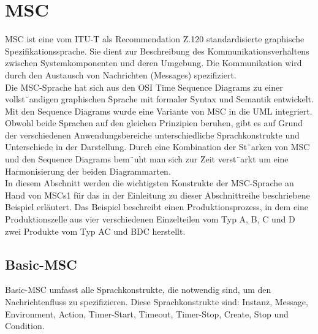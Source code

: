 
\section{MSC}
MSC ist eine vom ITU-T als Recommendation Z.120
standardisierte graphische Spezifikationssprache. Sie dient
zur Beschreibung des Kommunikationsverhaltens zwischen
Systemkomponenten und deren Umgebung. Die Kommunikation
wird durch den Austausch von Nachrichten (Messages)
spezifiziert.\\
Die MSC-Sprache hat sich aus den OSI Time Sequence
Diagrams zu einer vollst¨andigen graphischen Sprache
mit formaler Syntax und Semantik entwickelt.
Mit den Sequence Diagrams wurde eine Variante von MSC
in die UML integriert. Obwohl beide Sprachen auf den
gleichen Prinzipien beruhen, gibt es auf Grund der verschiedenen
Anwendungsbereiche unterschiedliche Sprachkonstrukte
und Unterschiede in der Darstellung. Durch eine
Kombination der St¨arken von MSC und den Sequence
Diagrams bem¨uht man sich zur Zeit verst¨arkt um eine Harmonisierung der beiden Diagrammarten.\\
In diesem Abschnitt werden die wichtigsten Konstrukte der
MSC-Sprache an Hand von MSCs1 für das in der Einleitung zu dieser Abschnittreihe beschriebene Beispiel erläutert. Das Beispiel beschreibt einen Produktionsprozess, in dem eine Produktionszelle aus vier verschiedenen Einzelteilen vom Typ A, B, C und D zwei Produkte vom Typ AC und BDC herstellt.


\subsection{Basic-MSC}
Basic-MSC umfasst alle Sprachkonstrukte, die notwendig sind, um den Nachrichtenfluss zu spezifizieren. Diese
Sprachkonstrukte sind: Instanz, Message, Environment, Action, Timer-Start, Timeout, Timer-Stop, Create, Stop und
Condition.\\

